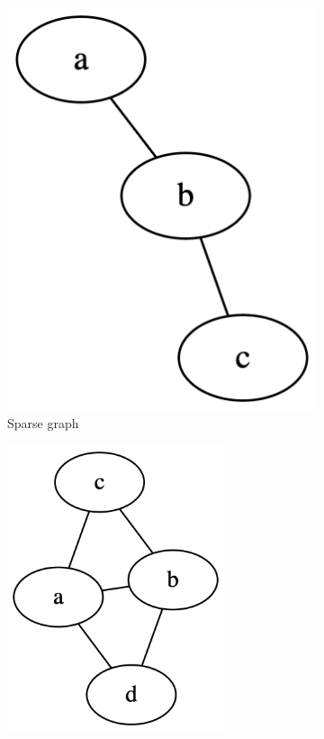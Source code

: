 \documentclass[a3paper, landscape, 11pt]{article} %
\begin{document}
\begin{multicols*}{4}
{\begin{figure}[H]
  \centering
  \begin{subfigure}[b]{0.3\columnwidth}
    \centering
    \includegraphics[width=0.7\columnwidth]{images/sparse.png}
    \caption{Sparse graph}
    \label{fig:image1}
  \end{subfigure}
  \hfill
  \begin{subfigure}[b]{0.3\columnwidth}
    \centering
    \includegraphics[width=0.7\textwidth]{images/dense.png}

\end{subfigure}
\end{figure}}
\end{multicols*}
\end{document}
